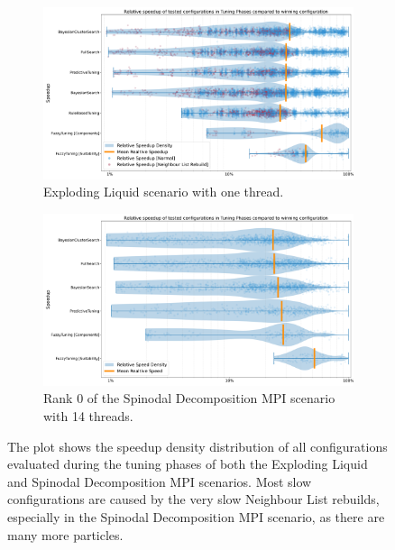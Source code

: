 \begin{figure}[H]
    \centering

    \begin{subfigure}[c]{\textwidth}
        \includegraphics[width=\columnwidth,trim={1cm 0 0cm 1cm},clip]{figures/Benchmark/Observations/tuning_phase_speedup_explodingLiquid_1_zoomed.png}
        \caption{Exploding Liquid scenario with one thread.}
        \label{fig:explodingLiquidSpeedupDensity}
    \end{subfigure}


    \begin{subfigure}[c]{\textwidth}
        \includegraphics[width=\columnwidth,trim={1cm 0 0cm 1cm},clip]{figures/Benchmark/Observations/tuning_phase_speedup_SpinodalDecompositionMPI_14_0.png}
        \caption{Rank 0 of the Spinodal Decomposition MPI scenario with 14 threads.}
        \label{fig:spinodalSpeedupDensity}
    \end{subfigure}


    \caption[Quality of predictions during tuning phases]{The plot shows the speedup density distribution of all configurations evaluated during the tuning phases of both the Exploding Liquid and Spinodal Decomposition MPI scenarios. Most slow configurations are caused by the very slow Neighbour List rebuilds, especially in the Spinodal Decomposition MPI scenario, as there are many more particles.}
    \label{fig:tuningPhaseSpeedup}
\end{figure}
